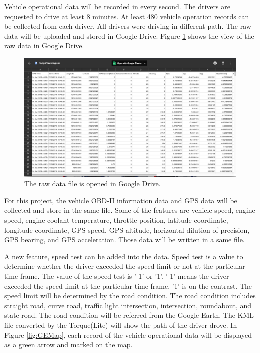 Vehicle operational data will be recorded in every second. The drivers are requested to drive at least 8 minutes. At least 480 vehicle operation records can be collected from each driver. All drivers were driving in different path. The raw data will be uploaded and stored in Google Drive. Figure \ref{fig:GDfile} shows  the view of the raw data in Google Drive.

\begin{figure}[hbt!]\centering
\includegraphics[width=.75\textwidth]{image/GDfile}
\caption{The raw data file is opened in Google Drive.}
\label{fig:GDfile}
\end{figure}

For this project, the vehicle OBD-II information data and GPS data will be collected and store in the same file. Some of the features are vehicle speed, engine speed, engine coolant temperature, throttle position, latitude coordinate, longitude coordinate, GPS speed, GPS altitude, horizontal dilution of precision, GPS bearing, and GPS acceleration. Those data will be written in a same file.

A new feature, speed test can be added into the data. Speed test is a value to determine whether the driver exceeded the speed limit or not at the particular time frame. The value of the speed test is '-1' or '1'. '-1' means the driver exceeded the speed limit at the particular time frame. '1' is on the contrast. The speed limit will be determined by the road condition. The road condition includes straight road, curve road, traffic light intersection, intersection, roundabout, and state road. The road condition will be referred from the Google Earth. The KML file converted by the Torque(Lite) will show the path of the driver drove. In Figure \ref{fig:GEMap}, each record of the vehicle operational data will be displayed as a green arrow and marked on the map. 

